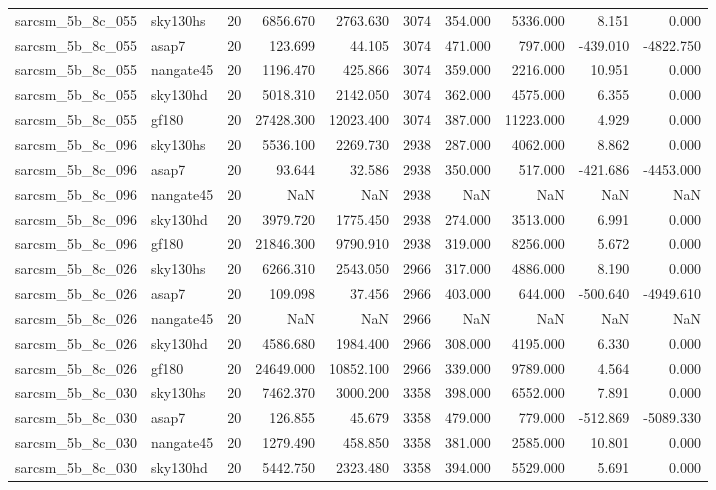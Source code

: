 \begin{tabular}{llrrrrrrrr}
sarcsm\_5b\_8c\_055 & sky130hs & 20 & 6856.670 & 2763.630 & 3074 & 354.000 & 5336.000 & 8.151 & 0.000 \\
sarcsm\_5b\_8c\_055 & asap7 & 20 & 123.699 & 44.105 & 3074 & 471.000 & 797.000 & -439.010 & -4822.750 \\
sarcsm\_5b\_8c\_055 & nangate45 & 20 & 1196.470 & 425.866 & 3074 & 359.000 & 2216.000 & 10.951 & 0.000 \\
sarcsm\_5b\_8c\_055 & sky130hd & 20 & 5018.310 & 2142.050 & 3074 & 362.000 & 4575.000 & 6.355 & 0.000 \\
sarcsm\_5b\_8c\_055 & gf180 & 20 & 27428.300 & 12023.400 & 3074 & 387.000 & 11223.000 & 4.929 & 0.000 \\
sarcsm\_5b\_8c\_096 & sky130hs & 20 & 5536.100 & 2269.730 & 2938 & 287.000 & 4062.000 & 8.862 & 0.000 \\
sarcsm\_5b\_8c\_096 & asap7 & 20 & 93.644 & 32.586 & 2938 & 350.000 & 517.000 & -421.686 & -4453.000 \\
sarcsm\_5b\_8c\_096 & nangate45 & 20 & NaN & NaN & 2938 & NaN & NaN & NaN & NaN \\
sarcsm\_5b\_8c\_096 & sky130hd & 20 & 3979.720 & 1775.450 & 2938 & 274.000 & 3513.000 & 6.991 & 0.000 \\
sarcsm\_5b\_8c\_096 & gf180 & 20 & 21846.300 & 9790.910 & 2938 & 319.000 & 8256.000 & 5.672 & 0.000 \\
sarcsm\_5b\_8c\_026 & sky130hs & 20 & 6266.310 & 2543.050 & 2966 & 317.000 & 4886.000 & 8.190 & 0.000 \\
sarcsm\_5b\_8c\_026 & asap7 & 20 & 109.098 & 37.456 & 2966 & 403.000 & 644.000 & -500.640 & -4949.610 \\
sarcsm\_5b\_8c\_026 & nangate45 & 20 & NaN & NaN & 2966 & NaN & NaN & NaN & NaN \\
sarcsm\_5b\_8c\_026 & sky130hd & 20 & 4586.680 & 1984.400 & 2966 & 308.000 & 4195.000 & 6.330 & 0.000 \\
sarcsm\_5b\_8c\_026 & gf180 & 20 & 24649.000 & 10852.100 & 2966 & 339.000 & 9789.000 & 4.564 & 0.000 \\
sarcsm\_5b\_8c\_030 & sky130hs & 20 & 7462.370 & 3000.200 & 3358 & 398.000 & 6552.000 & 7.891 & 0.000 \\
sarcsm\_5b\_8c\_030 & asap7 & 20 & 126.855 & 45.679 & 3358 & 479.000 & 779.000 & -512.869 & -5089.330 \\
sarcsm\_5b\_8c\_030 & nangate45 & 20 & 1279.490 & 458.850 & 3358 & 381.000 & 2585.000 & 10.801 & 0.000 \\
sarcsm\_5b\_8c\_030 & sky130hd & 20 & 5442.750 & 2323.480 & 3358 & 394.000 & 5529.000 & 5.691 & 0.000 \\

\end{tabular}

